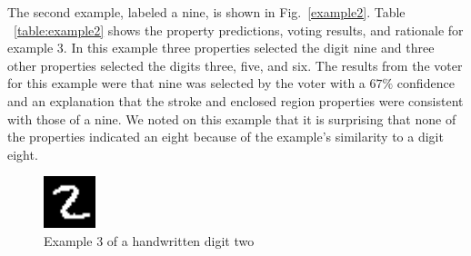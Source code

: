 \documentclass[conference]{IEEEtran}
\begin{document}
The second example,  labeled a nine, is shown in Fig.~\ref{example2}.  Table ~\ref{table:example2} shows the property predictions, voting results, and rationale for example 3.  In this example three properties selected the digit nine and three other properties selected the digits three, five, and six.  The results from the voter for this example were that nine was selected by the voter with a $67\%$ confidence and an explanation that the stroke and enclosed region properties were consistent with those of a nine.  We noted on this example that it is surprising that none of the properties indicated an eight because of the example's similarity to a digit eight.  

 \begin{figure}[htbp]
\centerline{\includegraphics[width=15mm]{./digit-images/2-4.png}}
\caption{Example 3 of a handwritten digit two}
\label{example3}
\end{figure}

\end{document}
